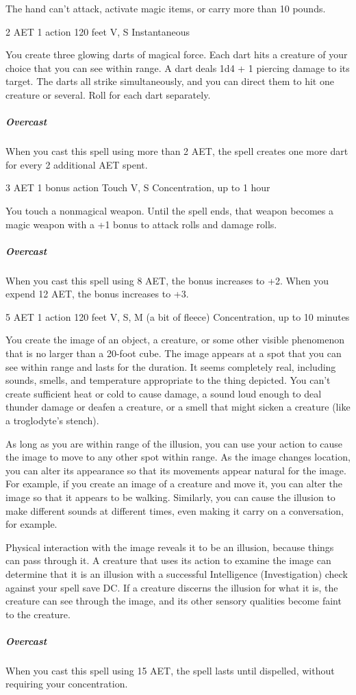 The hand can't attack, activate magic items, or carry more than 10 pounds.

\label{spell:magic-missile}
{2 AET}
{1 action}
{120 feet}
{V, S}
{Instantaneous}

You create three glowing darts of magical force. Each dart hits a creature of your choice that you can see within range. A dart deals 1d4 + 1 piercing damage to its target. The darts all strike simultaneously, and you can direct them to hit one creature or several. Roll for each dart separately.

\subparagraph*{Overcast} When you cast this spell using more than 2 AET, the spell creates one more dart for every 2 additional AET spent.

\label{spell:magic-weapon}
{3 AET}
{1 bonus action}
{Touch}
{V, S}
{Concentration, up to 1 hour}

You touch a nonmagical weapon. Until the spell ends, that weapon becomes a magic weapon with a +1 bonus to attack rolls and damage rolls.
\subparagraph*{Overcast} When you cast this spell using 8 AET, the bonus increases to +2. When you expend 12 AET, the bonus increases to +3.

\label{spell:major-image}
{5 AET}
{1 action}
{120 feet}
{V, S, M (a bit of fleece)}
{Concentration, up to 10 minutes}

You create the image of an object, a creature, or some other visible phenomenon that is no larger than a 20-foot cube. The image appears at a spot that you can see within range and lasts for the duration. It seems completely real, including sounds, smells, and temperature appropriate to the thing depicted. You can't create sufficient heat or cold to cause damage, a sound loud enough to deal thunder damage or deafen a creature, or a smell that might sicken a creature (like a troglodyte's stench).

As long as you are within range of the illusion, you can use your action to cause the image to move to any other spot within range. As the image changes location, you can alter its appearance so that its movements appear natural for the image. For example, if you create an image of a creature and move it, you can alter the image so that it appears to be walking. Similarly, you can cause the illusion to make different sounds at different times, even making it carry on a conversation, for example.

Physical interaction with the image reveals it to be an illusion, because things can pass through it. A creature that uses its action to examine the image can determine that it is an illusion with a successful Intelligence (Investigation) check against your spell save DC. If a creature discerns the illusion for what it is, the creature can see through the image, and its other sensory qualities become faint to the creature.
\subparagraph*{Overcast} When you cast this spell using 15 AET, the spell lasts until dispelled, without requiring your concentration.

